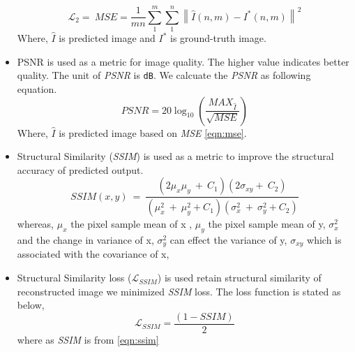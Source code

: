 \begin{itemize}
    \begin{equation}
    \mathcal{L}_{2}= \ MSE = \frac{1}{mn} \sum_{1}^{m} \sum_{1}^{n} \left \| \widehat I(n, m) - I^{*}(n, m)  \right \|^{2} 
     \label{eqn:mse}
\end{equation}
Where, $\widehat I$ is predicted image and $I^{*}$ is ground-truth image. 
    \item PSNR is used as a metric for image quality. The higher value indicates better quality. The unit of \textit{PSNR} is \texttt{dB}. We calcuate the \textit{PSNR} as following equation.
    \begin{equation}
    PSNR = 20 \log_{10} \left ( \frac{MAX_{ \widehat I}}{\sqrt{MSE}} \right )
    \label{eqn:psnr}
    \end{equation}
    Where, $\widehat I$ is predicted image based on \textit{MSE}  \eqref{eqn:mse}.
    \item Structural Similarity (\textit{SSIM}) is used as a metric to improve the structural accuracy of predicted output.
    \begin{equation}
        SSIM(x, y) \ = \ \frac{\left ( 2\mu_{x}\mu_{y} \ + \ C_{1} \right) \left ( 2\sigma_{xy} + \ C_{2} \right)}{\left ( \mu_{x}^{2} \ + \ \mu_{y}^{2} + C_{1} \right ) \left ( \sigma_{x}^{2} \ + \ \sigma_{y}^{2} + C_{2} \right )}
        \label{eqn:ssim}
    \end{equation}
     whereas, $\mu _{x}$ the pixel sample mean of x , $\mu _{y}$ the pixel sample mean of y, $\sigma _{x}^{2}$ and the change in variance of x, $\sigma _{y}^{2}$ can effect the variance of y, $\sigma_{xy}$ which is associated with the covariance of x,
     \item Structural Similarity loss ($\mathcal{L}_{SSIM}$) is used retain structural similarity of reconstructed image we minimized \textit{SSIM} loss. The loss function is stated as below,
     \begin{equation}
         \mathcal{L}_{SSIM} = \frac{\left ( 1- SSIM \right )}{2}
         \label{eqn:ssim_loss}
     \end{equation}
     where as \textit{SSIM} is from \eqref{eqn:ssim}
\end{itemize}



